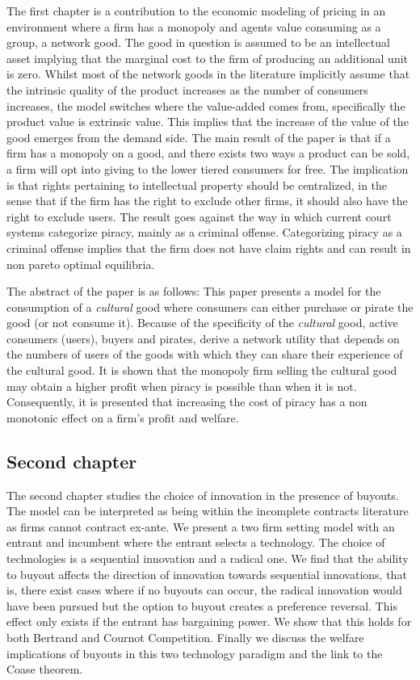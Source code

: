 The first chapter is a contribution to the economic modeling of pricing in an environment where a firm has a monopoly and agents value consuming as a group, a network good. The good in question is assumed to be an intellectual asset implying that the marginal cost to the firm of producing an additional unit is zero. Whilst most of the network goods in the literature implicitly assume that the intrinsic quality of the product increases as the number of consumers increases, the model switches where the value-added comes from, specifically the product value is extrinsic value. This implies that the increase of the value of the good emerges from the demand side. The main result of the paper is that if a firm has a monopoly on a good, and there exists two ways a product can be sold, a firm will opt into giving to the lower tiered consumers for free. The implication is that rights pertaining to intellectual property should be centralized, in the sense that if the firm has the right to exclude other firms, it should also have the right to exclude users. The result goes against the way in which current court systems categorize piracy, mainly as a criminal offense. Categorizing piracy as a criminal offense implies that the firm does not have claim rights and can result in non pareto optimal equilibria. 

The abstract of the paper is as follows: This paper presents a model for the consumption of a \textit{cultural} good where consumers can either purchase or pirate the good (or not consume it). Because of the specificity of the \textit{cultural} good, active consumers (users), buyers and pirates, derive a network utility that depends on the numbers of users of the goods with which they can share their experience of the cultural good. It is shown that the monopoly firm selling the cultural good may obtain a higher profit when piracy is possible than when it is not. Consequently, it is presented that increasing the cost of piracy has a non monotonic effect on a firm's profit and welfare.

\subsection{Second chapter}

The second chapter studies the choice of innovation in the presence of buyouts. The model can be interpreted as being within the incomplete contracts literature as firms cannot contract ex-ante. We present a two firm setting model with an entrant and incumbent where the entrant selects a technology. The choice of technologies is a sequential innovation and a radical one. We find that the ability to buyout affects the direction of innovation towards sequential innovations, that is, there exist cases where if no buyouts can occur, the radical innovation would have been pursued but the option to buyout creates a preference reversal. This effect only exists if the entrant has bargaining power. We show that this holds for both Bertrand and Cournot Competition. Finally we discuss the welfare implications of buyouts in this two technology paradigm and the link to the Coase theorem. 

